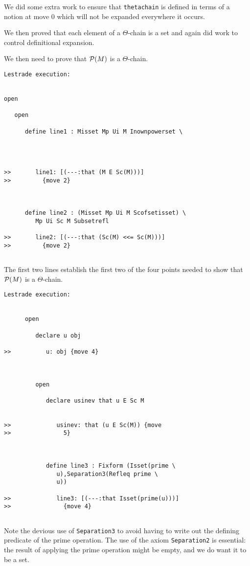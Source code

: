 \documentclass[12pt]{article}
\begin{document}
We did some extra work to ensure that {\tt thetachain} is defined in terms of a notion at move 0 which will not be expanded everywhere it occurs.

We then proved that each element of a $\Theta$-chain is a set and again did work to control definitional expansion.

We then need to prove that ${\cal P}(M)$ is a $\Theta$-chain.

\begin{verbatim}Lestrade execution:


open

   open

      define line1 : Misset Mp Ui M Inownpowerset \
         



>>       line1: [(---:that (M E Sc(M)))]
>>         {move 2}



      define line2 : (Misset Mp Ui M Scofsetisset) \
         Mp Ui Sc M Subsetrefl

>>       line2: [(---:that (Sc(M) <<= Sc(M)))]
>>         {move 2}


\end{verbatim}

The first two lines establish the first two of the four points needed to show that ${\cal P}(M)$ is a $\Theta$-chain.

\begin{verbatim}Lestrade execution:


      open

         declare u obj

>>          u: obj {move 4}



         open

            declare usinev that u E Sc M


>>             usinev: that (u E Sc(M)) {move
>>               5}



            define line3 : Fixform (Isset(prime \
               u),Separation3(Refleq prime \
               u))

>>             line3: [(---:that Isset(prime(u)))]
>>               {move 4}


\end{verbatim}

Note the devious use of {\tt Separation3} to avoid having to write out the defining predicate of the prime operation.  The use of the axiom
{\tt Separation2} is essential:  the result of applying the prime operation might be empty, and we do want it to be a set.
\end{document}
